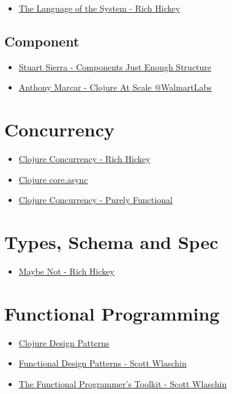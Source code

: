 \documentclass[11pt]{article}
\begin{document}
\begin{itemize}
\item \href{https://www.youtube.com/watch?v=ROor6\_NGIWU}{The Language of the System - Rich Hickey}
\end{itemize}

\subsection{Component}
\label{sec:org72f8f4d}

\begin{itemize}
\item \href{https://www.youtube.com/watch?v=13cmHf\_kt-Q}{Stuart Sierra - Components Just Enough Structure}
\item \href{https://www.youtube.com/watch?v=av9Xi6CNqq4}{Anthony Marcar - Clojure At Scale @WalmartLabs}
\end{itemize}

\section{Concurrency}
\label{sec:org389d61a}

\begin{itemize}
\item \href{https://www.youtube.com/watch?v=dGVqrGmwOAw}{Clojure Concurrency - Rich Hickey}
\item \href{https://www.infoq.com/presentations/clojure-core-async/}{Clojure core.async}
\item \href{https://purelyfunctional.tv/guide/clojure-concurrency/}{Clojure Concurrency - Purely Functional}
\end{itemize}

\section{Types, Schema and Spec}
\label{sec:orgbfb9819}

\begin{itemize}
\item \href{https://www.youtube.com/watch?v=YR5WdGrpoug}{Maybe Not - Rich Hickey}
\end{itemize}

\section{Functional Programming}
\label{sec:org2d8de8d}

\begin{itemize}
\item \href{http://mishadoff.com/blog/clojure-design-patterns/}{Clojure Design Patterns}
\item \href{https://www.youtube.com/watch?v=srQt1NAHYC0}{Functional Design Patterns - Scott Wlaschin}
\item \href{https://www.youtube.com/watch?v=Nrp\_LZ-XGsY}{The Functional Programmer's Toolkit - Scott Wlaschin}
\end{itemize}
\end{document}
